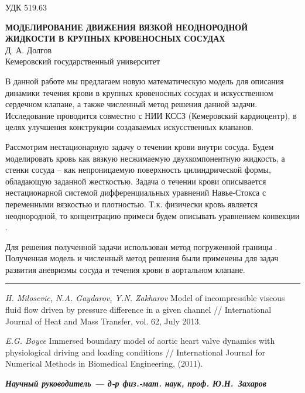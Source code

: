 \documentclass{article}
\begin{document}
\begin{flushright}
УДК 519.63    %
\end{flushright}

\begin{center}
\textbf{МОДЕЛИРОВАНИЕ ДВИЖЕНИЯ ВЯЗКОЙ НЕОДНОРОДНОЙ ЖИДКОСТИ В КРУПНЫХ КРОВЕНОСНЫХ СОСУДАХ}
\\
\vspace{\baselineskip}
Д. А. Долгов
\\
Кемеровский государственный университет
\end{center}
\vspace{\baselineskip}

В данной работе мы предлагаем новую математическую модель для описания динамики течения крови в крупных кровеносных сосудах и искусственном сердечном клапане, а также численный метод решения данной задачи. Исследование проводится совместно с НИИ КССЗ (Кемеровский кардиоцентр), в целях улучшения конструкции создаваемых искусственных клапанов.

Рассмотрим нестационарную задачу о течении крови внутри сосуда. Будем моделировать кровь как вязкую несжимаемую двухкомпонентную жидкость, а стенки сосуда – как непроницаемую поверхность цилиндрической формы, обладающую заданной жесткостью. Задача о течении крови описывается нестационарной системой дифференциальных уравнений Навье-Стокса \cite{zaharov_miloshevich} с переменными вязкостью и плотностью. Т.к. физически кровь является неоднородной, то концентрацию примеси будем описывать уравнением конвекции \cite{zaharov_miloshevich}.  

Для решения полученной задачи использован метод погруженной границы \cite{boyce}. Полученная модель и численный метод решения были применены для задач развития аневризмы сосуда и течения крови в аортальном клапане.

\noindent\rule{50.0mm}{0.1mm}

\begin{enumerate}
\textit{H. Milosevic, N.A. Gaydarov, Y.N. Zakharov} Model of incompressible viscous fluid flow driven by  pressure difference in a given channel // International Journal of Heat and Mass Transfer, vol. 62, July 2013.

\textit{E.G. Boyce} Immersed boundary model of aortic heart valve dynamics with physiological driving and loading conditions // International Journal for Numerical Methods in Biomedical Engineering, (2011).
\end{enumerate}


\begin{flushright}
\textbf{\textit{Научный руководитель --- д-р физ.-мат. наук, проф.
Ю.Н.~Захаров}}

\end{flushright}
\end{document}
